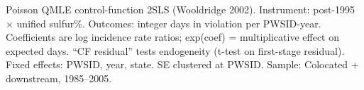 \par \raggedright 
Poisson QMLE control-function 2SLS (Wooldridge 2002). Instrument: post-1995 $\times$ unified sulfur\%. Outcomes: integer days in violation per PWSID-year. Coefficients are log incidence rate ratios; exp(coef) = multiplicative effect on expected days. ``CF residual'' tests endogeneity (t-test on first-stage residual). Fixed effects: PWSID, year, state. SE clustered at PWSID. Sample: Colocated + downstream, 1985--2005.
\par\endgroup


